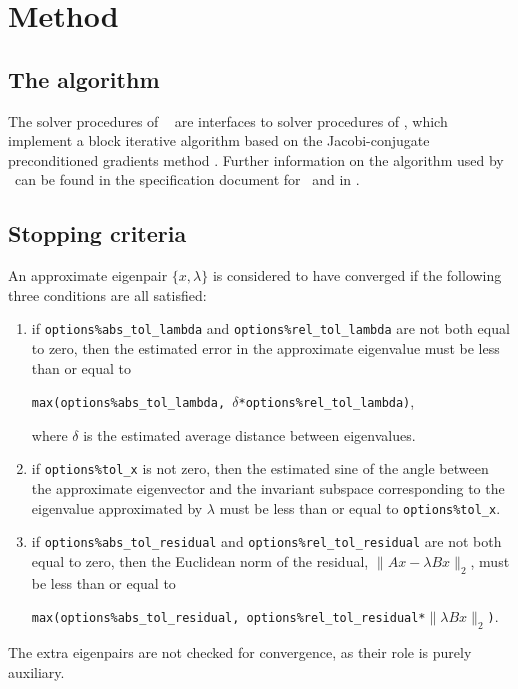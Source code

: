\section{Method}
\label{sec:method}

\subsection{The algorithm}

The solver procedures of
\fullpackagename\ %
are interfaces to solver procedures of
{\tt \engine}, which 
implement a block iterative algorithm
based on the Jacobi-conjugate preconditioned gradients %
method \cite{jcpg1,jcpg2}.
Further information on the algorithm used by
\fullpackagename\ can be found in the
specification document for \engine\
and in \report.

\subsection{Stopping criteria}

An approximate eigenpair 
$\{x,\lambda\}$ is considered to have converged
if %
the following three conditions are all satisfied:
%
\begin{enumerate}
%
\item
if {\tt options\%abs\_tol\_lambda} and 
{\tt options\%rel\_tol\_lambda}
are not both equal to zero, then
the estimated error in the approximate eigenvalue
must be less than or equal to

{\tt max(options\%abs\_tol\_lambda, 
$\delta$*options\%rel\_tol\_lambda)},

where $\delta$ is the estimated average distance
between eigenvalues.
\item
if {\tt options\%tol\_x} is not zero, then
the estimated sine of the angle between
the approximate eigenvector and the invariant subspace
corresponding to the eigenvalue 
approximated by $\lambda$
must be less than or equal to {\tt options\%tol\_x}.
\item
if {\tt options\%abs\_tol\_residual} and 
{\tt options\%rel\_tol\_residual}
are not both equal to zero, then
the Euclidean norm of the residual,
$\|A x - \lambda B x\|_2$,
must be less than or equal to

{\tt max(options\%abs\_tol\_residual, 
options\%rel\_tol\_residual*$\|\lambda B x\|_2$)}.
%
\end{enumerate}
%
The extra eigenpairs are not checked for convergence,
as their role is purely auxiliary.


